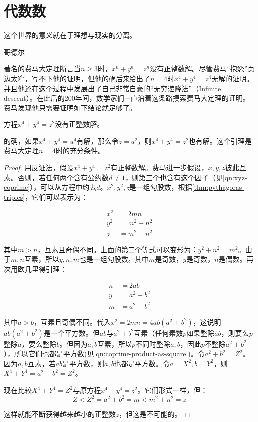 \documentclass[b5paper]{ctexart}
\begin{document}
\section{代数数}
\fi

\epigraph{这个世界的意义就在于理想与现实的分离。}{哥德尔}

著名的费马大定理断言当$n \geq 3$时，$x^n + y^n = z^n$没有正整数解。尽管费马“抱怨”页边太窄，写不下他的证明，但他的确后来给出了$n=4$时$x^4 + y^4 = z^4$无解的证明。并且他还在这个过程中发展出了自己非常自豪的“无穷递降法”（Infinite descent）。在此后的200年间，数学家们一直沿着这条路摸索费马大定理的证明。费马发现他只需要证明如下结论就足够了。

\begin{lemma}
方程$x^4 + y^4 = z^2$没有正整数解。
\end{lemma}

的确，如果$x^4 + y^4 = u^4$有解，那么令$z = u^2$，则$x^4 + y^4 = z^2$也有解。这个引理是费马大定理$n = 4$时的充分条件。

\begin{proof}
用反证法，假设$x^4 + y^4 = z^2$有正整数解。费马进一步假设，$x, y, z$彼此互素。否则，若任何两个含有公约数$d \ne 1$，则第三个也含有这个因子（见\cref{qn:xyz-coprime}），可以从方程中约去$d$。$x^2, y^2, z$是一组勾股数，根据\cref{thm:pythagoras-triples}，它们可以表示为：

\begin{align*}
x^2 &= 2mn \\
y^2 &= m^2 - n^2 \\
z &= m^2 + n^2
\end{align*}

其中$m > n$，互素且奇偶不同。上面的第二个等式可以变形为：$y^2 + n^2 = m^2$。由于$m, n$互素，所以$y, n, m$也是一组勾股数。其中$m$是奇数，$y$是奇数，$n$是偶数。再次用欧几里得引理：

\begin{align*}
n &= 2ab \\
y &= a^2 - b^2 \\
m &= a^2 + b^2
\end{align*}

其中$a > b$，互素且奇偶不同。代入$x^2 = 2mn = 4ab(a^2 + b^2)$，这说明$ab(a^2 + b^2)$是一个平方数。但$ab$与$a^2 + b^2$互素（任何素数$p$如果整除$ab$，则要么$p$整除$a$，要么整除$b$。但因为$a, b$互素，所以$p$不同时整除$a, b$，因此$p$不整除$a^2 + b^2$），所以它们也都是平方数(见\cref{qn:coprime-product-as-square})。令$a^2 + b^2 = Z^2$。因为$a, b$互素，若$ab$是平方数，则$a, b$也都是平方数。令$a = X^2, b= Y^2$，则$X^4 + Y^4 = a^2 + b^2 = Z^2$。

现在比较$X^4 + Y^4 = Z^2$与原方程$x^4 + y^4 = z^2$。它们形式一样，但：
\[
Z < Z^2 = a^2 + b^2 = m < m^2 + n^2 = z
\]

这样就能不断获得越来越小的正整数$z$，但这是不可能的。
\end{proof}
\end{document}
